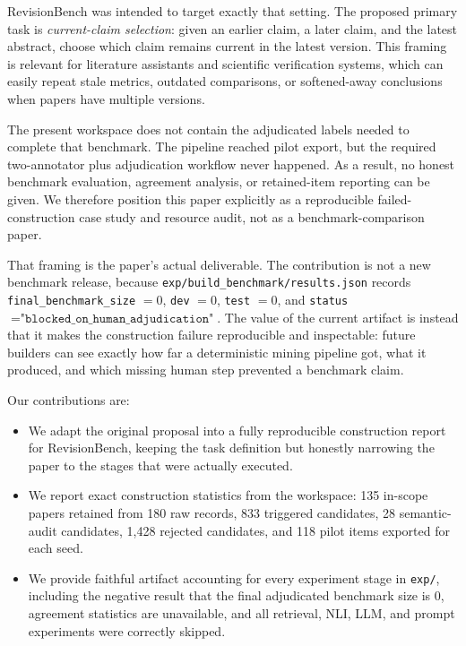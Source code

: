 \documentclass{article}
\begin{document}
RevisionBench was intended to target exactly that setting. The proposed primary task is \emph{current-claim selection}: given an earlier claim, a later claim, and the latest abstract, choose which claim remains current in the latest version. This framing is relevant for literature assistants and scientific verification systems, which can easily repeat stale metrics, outdated comparisons, or softened-away conclusions when papers have multiple versions.

The present workspace does not contain the adjudicated labels needed to complete that benchmark. The pipeline reached pilot export, but the required two-annotator plus adjudication workflow never happened. As a result, no honest benchmark evaluation, agreement analysis, or retained-item reporting can be given. We therefore position this paper explicitly as a reproducible failed-construction case study and resource audit, not as a benchmark-comparison paper.

That framing is the paper's actual deliverable. The contribution is not a new benchmark release, because \texttt{exp/build\_benchmark/results.json} records \texttt{final\_benchmark\_size} $= 0$, \texttt{dev} $= 0$, \texttt{test} $= 0$, and \texttt{status} $= \texttt{"blocked\_on\_human\_adjudication"}$. The value of the current artifact is instead that it makes the construction failure reproducible and inspectable: future builders can see exactly how far a deterministic mining pipeline got, what it produced, and which missing human step prevented a benchmark claim.

Our contributions are:
\begin{itemize}[leftmargin=*]
  \item We adapt the original proposal into a fully reproducible construction report for RevisionBench, keeping the task definition but honestly narrowing the paper to the stages that were actually executed.
  \item We report exact construction statistics from the workspace: 135 in-scope papers retained from 180 raw records, 833 triggered candidates, 28 semantic-audit candidates, 1{,}428 rejected candidates, and 118 pilot items exported for each seed.
  \item We provide faithful artifact accounting for every experiment stage in \texttt{exp/}, including the negative result that the final adjudicated benchmark size is 0, agreement statistics are unavailable, and all retrieval, NLI, LLM, and prompt experiments were correctly skipped.
\end{itemize}
\end{document}
